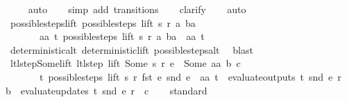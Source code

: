 \begin{isabellebody}
\ \ \ \isamarkupfalse%
\ auto{\isacharbrackleft}{}{\isacharbrackright}\isanewline
\ \ \isamarkupfalse%
\ {\isacharparenleft}simp\ add{\isacharcolon}\ transitions{\isacharparenright}\isanewline
\ \ \isamarkupfalse%
\ clarify\isanewline
\ \ \isamarkupfalse%
\ auto%
\endisatagproof
{\isafoldproof}%
%
\isadelimproof
\isanewline
%
\endisadelimproof
\isanewline
{}\isamarkupfalse%
\ possible{\isacharunderscore}steps{\isacharunderscore}lift{\isacharcolon}\ {\isachardoublequoteopen}possible{\isacharunderscore}steps\ lift\ s\ r\ a\ ba\ {\isasymnoteq}\ {\isacharbraceleft}{\isacharbar}{\isacharbar}{\isacharbraceright}\ {\isasymLongrightarrow}\isanewline
\ \ \ \ \ \ \ {\isasymexists}aa\ t{\isachardot}\ possible{\isacharunderscore}steps\ lift\ s\ r\ a\ ba\ {\isacharequal}\ {\isacharbraceleft}{\isacharbar}{\isacharparenleft}aa{\isacharcomma}\ t{\isacharparenright}{\isacharbar}{\isacharbraceright}{\isachardoublequoteclose}\isanewline
%
\isadelimproof
\ \ %
\endisadelimproof
%
\isatagproof
{}\isamarkupfalse%
\ deterministic{\isacharunderscore}alt\ deterministic{\isacharunderscore}lift\ possible{\isacharunderscore}steps{\isacharunderscore}alt\ \isamarkupfalse%
\ blast%
\endisatagproof
{\isafoldproof}%
%
\isadelimproof
\isanewline
%
\endisadelimproof
\isanewline
{}\isamarkupfalse%
\ ltl{\isacharunderscore}step{\isacharunderscore}Some{\isacharunderscore}lift{\isacharcolon}\ {\isachardoublequoteopen}{\isacharparenleft}ltl{\isacharunderscore}step\ lift\ {\isacharparenleft}Some\ s{\isacharparenright}\ r\ e\ {\isacharequal}\ {\isacharparenleft}Some\ aa{\isacharcomma}\ b{\isacharcomma}\ c{\isacharparenright}{\isacharparenright}\ {\isacharequal}\isanewline
\ \ \ \ \ \ \ {\isacharparenleft}{\isasymexists}t{\isachardot}\ possible{\isacharunderscore}steps\ lift\ s\ r\ {\isacharparenleft}fst\ e{\isacharparenright}\ {\isacharparenleft}snd\ e{\isacharparenright}\ {\isacharequal}\ {\isacharbraceleft}{\isacharbar}{\isacharparenleft}aa{\isacharcomma}\ t{\isacharparenright}{\isacharbar}{\isacharbraceright}\ {\isasymand}\ evaluate{\isacharunderscore}outputs\ t\ {\isacharparenleft}snd\ e{\isacharparenright}\ r\ {\isacharequal}\ b\ {\isasymand}\ evaluate{\isacharunderscore}updates\ t\ {\isacharparenleft}snd\ e{\isacharparenright}\ r\ {\isacharequal}\ c{\isacharparenright}{\isachardoublequoteclose}\isanewline
%
\isadelimproof
\ \ %
\endisadelimproof
%
\isatagproof
{}\isamarkupfalse%
\ standard\isanewline
\ \ \ \isamarkupfalse%

\end{isabellebody}
